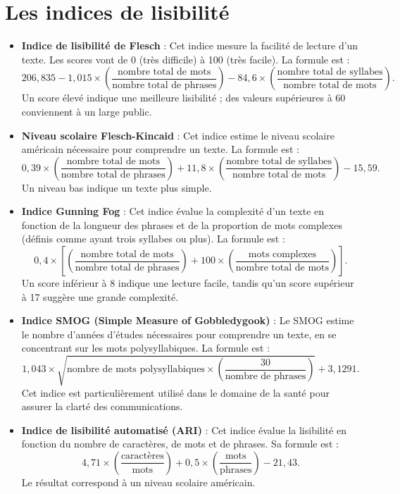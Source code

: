 \documentclass[12pt,a4paper,oneside,titlepage]{book} %
\begin{document}
	\section*{Les indices de lisibilité}
\begin{itemize}
		
\item \textbf{Indice de lisibilité de Flesch} : Cet indice mesure la facilité de lecture d’un texte. Les scores vont de 0 (très difficile) à 100 (très facile). La formule est :
\[
206{,}835 - 1{,}015 \times \left( \frac{\text{nombre total de mots}}{\text{nombre total de phrases}} \right) - 84{,}6 \times \left( \frac{\text{nombre total de syllabes}}{\text{nombre total de mots}} \right).
\]
Un score élevé indique une meilleure lisibilité ; des valeurs supérieures à 60 conviennent à un large public.

\item \textbf{Niveau scolaire Flesch-Kincaid} : Cet indice estime le niveau scolaire américain nécessaire pour comprendre un texte. La formule est :
\[
0{,}39 \times \left( \frac{\text{nombre total de mots}}{\text{nombre total de phrases}} \right) + 11{,}8 \times \left( \frac{\text{nombre total de syllabes}}{\text{nombre total de mots}} \right) - 15{,}59.
\]
Un niveau bas indique un texte plus simple.

\item \textbf{Indice Gunning Fog} : Cet indice évalue la complexité d’un texte en fonction de la longueur des phrases et de la proportion de mots complexes (définis comme ayant trois syllabes ou plus). La formule est :
\[
0{,}4 \times \left[ \left( \frac{\text{nombre total de mots}}{\text{nombre total de phrases}} \right) + 100 \times \left( \frac{\text{mots complexes}}{\text{nombre total de mots}} \right) \right].
\]
Un score inférieur à 8 indique une lecture facile, tandis qu’un score supérieur à 17 suggère une grande complexité.

\item \textbf{Indice SMOG (Simple Measure of Gobbledygook)} : Le SMOG estime le nombre d’années d’études nécessaires pour comprendre un texte, en se concentrant sur les mots polysyllabiques. La formule est :
\[
1{,}043 \times \sqrt{\text{nombre de mots polysyllabiques} \times \left( \frac{30}{\text{nombre de phrases}} \right)} + 3{,}1291.
\]
Cet indice est particulièrement utilisé dans le domaine de la santé pour assurer la clarté des communications.

\item \textbf{Indice de lisibilité automatisé (ARI)} : Cet indice évalue la lisibilité en fonction du nombre de caractères, de mots et de phrases. Sa formule est :
\[
4{,}71 \times \left( \frac{\text{caractères}}{\text{mots}} \right) + 0{,}5 \times \left( \frac{\text{mots}}{\text{phrases}} \right) - 21{,}43.
\]
Le résultat correspond à un niveau scolaire américain.


\end{itemize}
\end{document}
